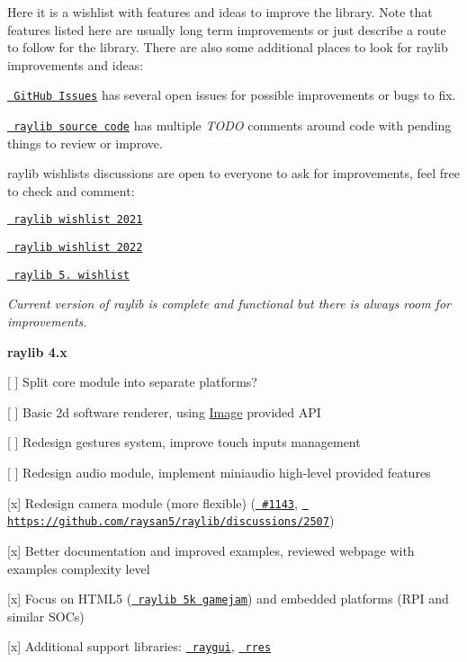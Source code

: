 Here it is a wishlist with features and ideas to improve the library. Note that features listed here are usually long term improvements or just describe a route to follow for the library. There are also some additional places to look for raylib improvements and ideas\+:


\begin{DoxyItemize}
\item \href{https://github.com/raysan5/raylib/issues}{\texttt{ Git\+Hub Issues}} has several open issues for possible improvements or bugs to fix.
\item \href{https://github.com/raysan5/raylib/tree/master/src}{\texttt{ raylib source code}} has multiple {\itshape TODO} comments around code with pending things to review or improve.
\item raylib wishlists discussions are open to everyone to ask for improvements, feel free to check and comment\+:
\begin{DoxyItemize}
\item \href{https://github.com/raysan5/raylib/discussions/1502}{\texttt{ raylib wishlist 2021}}
\item \href{https://github.com/raysan5/raylib/discussions/2272}{\texttt{ raylib wishlist 2022}}
\item \href{https://github.com/raysan5/raylib/discussions/2952}{\texttt{ raylib 5. wishlist}}
\end{DoxyItemize}
\end{DoxyItemize}

{\itshape Current version of raylib is complete and functional but there is always room for improvements.}

{\bfseries{raylib 4.\+x}}
\begin{DoxyItemize}
\item \mbox{[} \mbox{]} Split core module into separate platforms?
\item \mbox{[} \mbox{]} Basic 2d software renderer, using {\ttfamily \mbox{\hyperlink{structImage}{Image}}} provided API
\item \mbox{[} \mbox{]} Redesign gestures system, improve touch inputs management
\item \mbox{[} \mbox{]} Redesign audio module, implement miniaudio high-\/level provided features
\item \mbox{[}x\mbox{]} Redesign camera module (more flexible) (\href{https://github.com/raysan5/raylib/issues/1143}{\texttt{ \#1143}}, \href{https://github.com/raysan5/raylib/discussions/2507}{\texttt{ https\+://github.\+com/raysan5/raylib/discussions/2507}})
\item \mbox{[}x\mbox{]} Better documentation and improved examples, reviewed webpage with examples complexity level
\item \mbox{[}x\mbox{]} Focus on HTML5 (\href{https://itch.io/jam/raylib-5k-gamejam}{\texttt{ raylib 5k gamejam}}) and embedded platforms (RPI and similar SOCs)
\item \mbox{[}x\mbox{]} Additional support libraries\+: \href{https://github.com/raysan5/raygui}{\texttt{ raygui}}, \href{https://github.com/raysan5/rres}{\texttt{ rres}}
\end{DoxyItemize}

